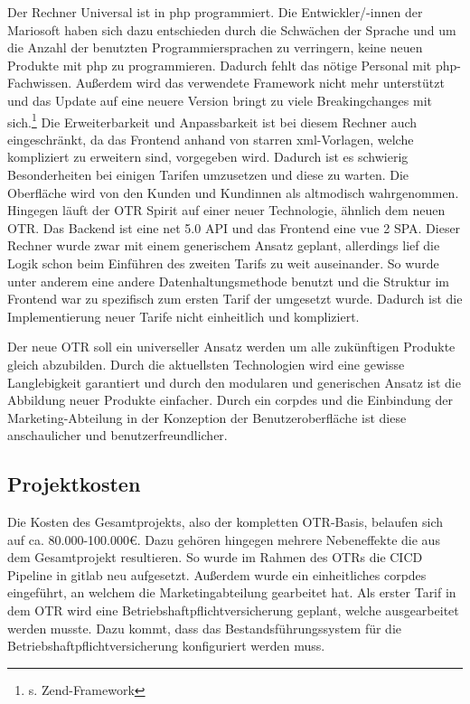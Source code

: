 Der Rechner \glqq Universal\grqq{} ist in \gls{php} programmiert. Die Entwickler/-innen der Mariosoft haben sich dazu entschieden durch die Schwächen der Sprache und um die Anzahl der benutzten Programmiersprachen zu verringern, keine neuen Produkte mit \gls{php} zu programmieren. Dadurch fehlt das nötige Personal mit \gls{php}-Fachwissen. Außerdem wird das verwendete Framework nicht mehr unterstützt und das Update auf eine neuere Version bringt zu viele Breakingchanges mit sich.\footnote{s.\cite{Zend} Zend-Framework} Die Erweiterbarkeit und Anpassbarkeit ist bei diesem Rechner auch eingeschränkt, da das Frontend anhand von starren \gls{xml}-Vorlagen, welche kompliziert zu erweitern sind, vorgegeben wird. Dadurch ist es schwierig Besonderheiten bei einigen Tarifen umzusetzen und diese zu warten. Die Oberfläche wird von den Kunden und Kundinnen als altmodisch wahrgenommen. \\
Hingegen läuft der \ac{OTR} \glqq Spirit\grqq{} auf einer neuer Technologie, ähnlich dem neuen \ac{OTR}. Das Backend ist eine \gls{net} 5.0 API und das Frontend eine \gls{vue} 2 \ac{SPA}. Dieser Rechner wurde zwar mit einem generischem Ansatz geplant, allerdings lief die Logik schon beim Einführen des zweiten Tarifs zu weit auseinander. So wurde unter anderem eine andere Datenhaltungsmethode benutzt und die Struktur im Frontend war zu spezifisch zum ersten Tarif der umgesetzt wurde. Dadurch ist die Implementierung neuer Tarife nicht einheitlich und kompliziert.

Der neue \ac{OTR} soll ein universeller Ansatz werden um alle zukünftigen Produkte gleich abzubilden. Durch die aktuellsten Technologien wird eine gewisse Langlebigkeit garantiert und durch den modularen und generischen Ansatz ist die Abbildung neuer Produkte einfacher. Durch ein \gls{corpdes} und die Einbindung der Marketing-Abteilung in der Konzeption der Benutzeroberfläche ist diese anschaulicher und benutzerfreundlicher.
\subsection{Projektkosten}
\label{projektkosten}
Die Kosten des Gesamtprojekts, also der kompletten \ac{OTR}-Basis, belaufen sich auf ca. 80.000-100.000€. Dazu gehören hingegen mehrere Nebeneffekte die aus dem Gesamtprojekt resultieren. So wurde im Rahmen des \ac{OTR}s die \ac{CICD} Pipeline in \gls{gitlab} neu aufgesetzt. Außerdem wurde ein einheitliches \gls{corpdes}	eingeführt, an welchem die Marketingabteilung gearbeitet hat. Als erster Tarif in dem \ac{OTR} wird eine Betriebshaftpflichtversicherung geplant, welche ausgearbeitet werden musste. Dazu kommt, dass das Bestandsführungssystem für die Betriebshaftpflichtversicherung konfiguriert werden muss.\\

